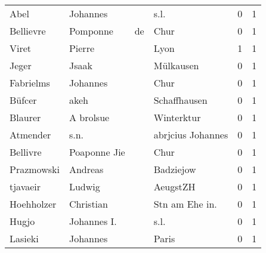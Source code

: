 \begin{center}
\begin{tiny}
\begin{longtabu}{llllrr}
                     Abel &                           Johannes &             &                                        s.l. &          0 &         1 \\
                Bellievre &                           Pomponne &          de &                                        Chur &          0 &         1 \\
                    Viret &                             Pierre &             &                                        Lyon &          1 &         1 \\
                    Jeger &                              Jsaak &             &                                   Mülkausen &          0 &         1 \\
                Fabrielms &                           Johannes &             &                                        Chur &          0 &         1 \\
                   Büfcer &                               akeh &             &                                Schaffhausen &          0 &         1 \\
                  Blaurer &                          A brolsue &             &                                  Winterktur &          0 &         1 \\
                 Atmender &                               s.n. &             &                           abrjcius Johannes &          0 &         1 \\
                 Bellivre &                       Poaponne Jie &             &                                        Chur &          0 &         1 \\
               Prazmowski &                            Andreas &             &                                   Badziejow &          0 &         1 \\
                 tjavaeir &                             Ludwig &             &                                    AeugstZH &          0 &         1 \\
               Hoehholzer &                          Christian &             &                             Stn am Ehe in.  &          0 &         1 \\
                    Hugjo &                        Johannes I. &             &                                        s.l. &          0 &         1 \\
                  Lasieki &                           Johannes &             &                                       Paris &          0 &         1 \\

\end{longtabu}
\end{tiny}
\end{center}
